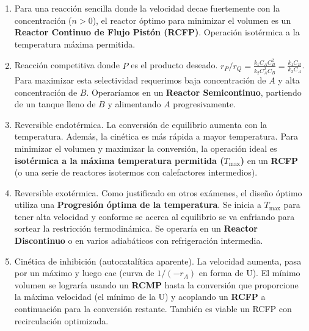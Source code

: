 \solve{}
\begin{enumerate}[label=\alph*)]
	\item Para una reacción sencilla donde la velocidad decae fuertemente con la concentración ($n>0$), el reactor óptimo para minimizar el volumen es un \textbf{Reactor Continuo de Flujo Pistón (RCFP)}. Operación isotérmica a la temperatura máxima permitida.
	\item Reacción competitiva donde $P$ es el producto deseado. $r_P / r_Q = \frac{k_1 C_A C_B^2}{k_2 C_A^2 C_B} = \frac{k_1 C_B}{k_2 C_A}$. Para maximizar esta selectividad requerimos baja concentración de $A$ y alta concentración de $B$. Operaríamos en un \textbf{Reactor Semicontinuo}, partiendo de un tanque lleno de $B$ y alimentando $A$ progresivamente.
	\item Reversible endotérmica. La conversión de equilibrio aumenta con la temperatura. Además, la cinética es más rápida a mayor temperatura. Para minimizar el volumen y maximizar la conversión, la operación ideal es \textbf{isotérmica a la máxima temperatura permitida ($T_{\text{max}}$)} en un \textbf{RCFP} (o una serie de reactores isotermos con calefactores intermedios).
	\item Reversible exotérmica. Como justificado en otros exámenes, el diseño óptimo utiliza una \textbf{Progresión óptima de la temperatura}. Se inicia a $T_{\text{max}}$ para tener alta velocidad y conforme se acerca al equilibrio se va enfriando para sortear la restricción termodinámica. Se operaría en un \textbf{Reactor Discontinuo} o en varios adiabáticos con refrigeración intermedia.
	\item Cinética de inhibición (autocatalítica aparente). La velocidad aumenta, pasa por un máximo y luego cae (curva de $1/(-r_A)$ en forma de U). El mínimo volumen se lograría usando un \textbf{RCMP} hasta la conversión que proporcione la máxima velocidad (el mínimo de la U) y acoplando un \textbf{RCFP} a continuación para la conversión restante. También es viable un RCFP con recirculación optimizada.
\end{enumerate}

